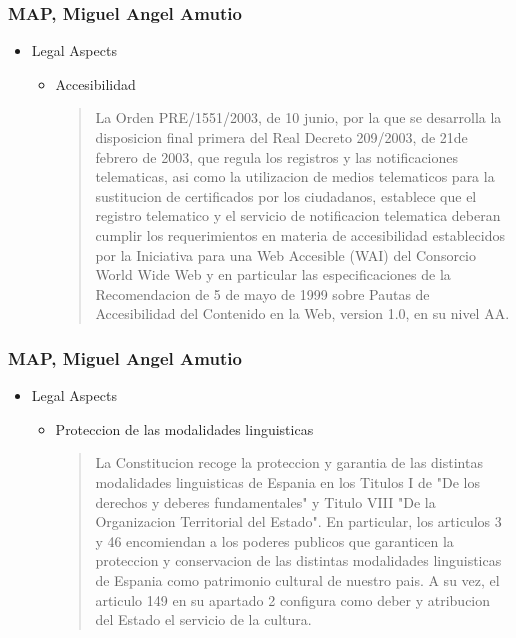 \documentclass{beamer}
\begin{document}
\begin{frame}
\frametitle{ MAP, Miguel Angel Amutio}

\begin{itemize}
\item Legal Aspects
\begin {itemize}
	\item Accesibilidad
	\begin{quote} 
La Orden PRE/1551/2003, de 10 junio, por la que se desarrolla la disposicion final primera del Real Decreto 209/2003, de
21de febrero de 2003, que regula los registros y las notificaciones telematicas, asi como la utilizacion de medios telematicos para la
sustitucion de certificados por los ciudadanos, establece que el registro telematico y el servicio de notificacion telematica
deberan cumplir los requerimientos en materia de accesibilidad establecidos por la Iniciativa para una Web
Accesible (WAI) del Consorcio World Wide Web y en particular las especificaciones de la Recomendacion de 5
de mayo de 1999 sobre Pautas de Accesibilidad del Contenido en la Web, version 1.0, en su nivel AA.


	\end{quote}
\end {itemize}
\end{itemize}

\end{frame}


\begin{frame}
\frametitle{ MAP, Miguel Angel Amutio}

\begin{itemize}
\item Legal Aspects
\begin {itemize}
	\item Proteccion de las modalidades linguisticas

	\begin{quote} 

La Constitucion recoge la proteccion y garantia de las distintas modalidades linguisticas de Espania en los Titulos I de
"De los derechos y deberes fundamentales" y Titulo VIII "De la Organizacion Territorial del Estado". En particular, los
articulos 3 y 46 encomiendan a los poderes publicos que garanticen la proteccion y conservacion de las distintas
modalidades linguisticas de Espania como patrimonio cultural de nuestro pais. A su vez, el articulo 149 en su
apartado 2 configura como deber y atribucion del Estado el servicio de la cultura.

	\end{quote}
\end {itemize}
\end{itemize}

\end{frame}
\end{document}
